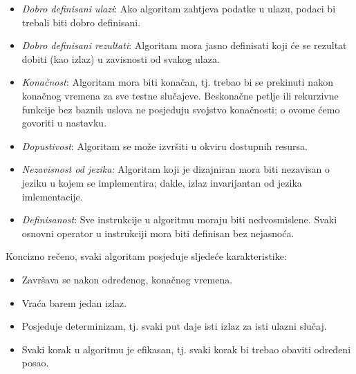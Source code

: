 \begin{itemize}
    \item    \textit{Dobro definisani ulazi}: Ako algoritam zahtjeva podatke u ulazu, podaci bi trebali biti dobro definisani. 
    \item \textit{Dobro definisani rezultati}: Algoritam mora jasno definisati koji će se rezultat dobiti (kao izlaz) u zavisnosti od svakog ulaza. %
    \item    \textit{Konačnost}: Algoritam mora biti konačan, tj. trebao bi se prekinuti nakon konačnog vremena za sve testne slučajeve. Beskonačne petlje ili rekurzivne funkcije bez baznih uslova ne posjeduju svojstvo konačnosti; o ovome ćemo govoriti u nastavku.  
    \item  \textit{Dopustivost}: Algoritam  se može izvršiti u okviru dostupnih resursa.  %
      \item \textit{Nezavisnost od jezika:} Algoritam koji je dizajniran mora biti nezavisan o jeziku u kojem se implementira; dakle, izlaz invarijantan od jezika imlementacije.
      \item   \textit{Definisanost}: Sve instrukcije u algoritmu moraju biti nedvosmislene. Svaki osnovni operator u instrukciji mora biti definisan bez   nejasnoća.    %
\end{itemize}
Koncizno rečeno, svaki algoritam posjeduje sljedeće karakteristike:  
\begin{itemize}
	\item Završava se nakon određenog, konačnog vremena.
    \item Vraća barem jedan izlaz.
    \item Posjeduje determinizam, tj. svaki put daje isti izlaz za isti ulazni slučaj.
    \item Svaki korak u algoritmu je efikasan, tj. svaki korak bi trebao obaviti određeni posao.
\end{itemize}

